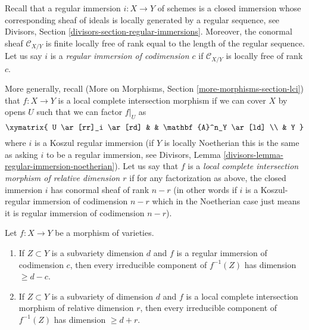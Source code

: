\medskip\noindent
Recall that a regular immersion $i : X \to Y$ of schemes
is a closed immersion whose
corresponding sheaf of ideals is locally generated by a regular sequence, see
Divisors, Section \ref{divisors-section-regular-immersions}.
Moreover, the conormal sheaf $\mathcal{C}_{X/Y}$ is finite locally free of
rank equal to the length of the regular sequence. Let us say $i$ is a
{\it regular immersion of codimension $c$}
if $\mathcal{C}_{X/Y}$ is locally free of rank $c$.

\medskip\noindent
More generally, recall
(More on Morphisms, Section \ref{more-morphisms-section-lci})
that $f : X \to Y$ is a local complete intersection
morphism if we can cover $X$ by opens $U$ such that we can factor
$f|_U$ as
$$
\xymatrix{
U \ar[rr]_i \ar[rd] & & \mathbf{A}^n_Y \ar[ld] \\
& Y
}
$$
where $i$ is a Koszul regular immersion (if $Y$ is locally Noetherian
this is the same as asking $i$ to be a regular immersion, see
Divisors, Lemma \ref{divisors-lemma-regular-immersion-noetherian}).
Let us say that $f$ is a {\it local complete intersection morphism
of relative dimension $r$} if for any factorization as above, the
closed immersion $i$ has conormal sheaf of rank $n - r$ (in other
words if $i$ is a Koszul-regular immersion of codimension $n - r$
which in the Noetherian case just means it is regular immersion of
codimension $n - r$).

\begin{lemma}
\label{lemma-pullback-by-regular-immersion}
Let $f : X \to Y$ be a morphism of varieties.
\begin{enumerate}
\item If $Z \subset Y$ is a subvariety dimension $d$ and $f$ is a regular
immersion of codimension $c$, then every irreducible component
of $f^{-1}(Z)$ has dimension $\geq d - c$.
\item If $Z \subset Y$ is a subvariety of dimension $d$ and
$f$ is a local complete intersection morphism of relative dimension $r$,
then every irreducible component of $f^{-1}(Z)$ has dimension $\geq d + r$.
\end{enumerate}
\end{lemma}


